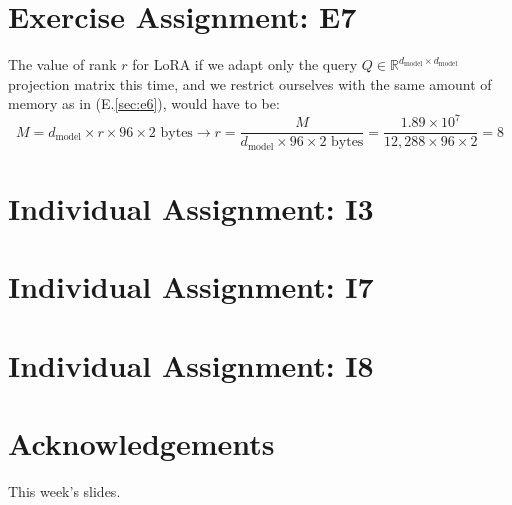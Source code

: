 \documentclass{article}
\begin{document}
\section{Exercise Assignment: E7}\label{sec:e7}
The value of rank $r$ for LoRA if we adapt only the query $Q \in \mathbb{R}^{d_{\text{model}} \times d_{\text{model}}}$ projection matrix this time, and we restrict ourselves with the same amount of memory as in (E.\ref{sec:e6}), would have to be:
\[
    M = d_{\text{model}} \times r \times 96 \times 2 \text{ bytes} \rightarrow r = \frac{M}{d_{\text{model}} \times 96 \times 2 \text{ bytes}} = \frac{1.89 \times 10^7}{12{,}288 \times 96 \times 2} = 8
\]

\section{Individual Assignment: I3}\label{sec:i3}

\section{Individual Assignment: I7}\label{sec:i7}

\section{Individual Assignment: I8}\label{sec:i8}


\clearpage

\section*{Acknowledgements}
This week's slides.




\clearpage

\end{document}
